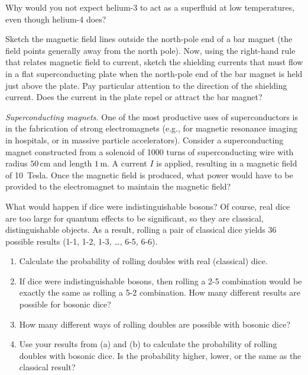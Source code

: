 \begin{problem}
Why would you not expect helium-3 to act as a superfluid at low
  temperatures, even though helium-4 does?
\label{prob:he3_superfluid}
\end{problem}


\begin{problem}
  Sketch the magnetic field lines outside the north-pole end of a bar
  magnet (the field points generally away from the north pole).  Now,
  using the right-hand rule that relates magnetic field to current,
  sketch the shielding currents that must flow in a flat
  superconducting plate when the north-pole end of the bar magnet is
  held just above the plate.  Pay particular attention to the
  direction of the shielding current.  Does the current in the plate
  repel or attract the bar magnet?
\label{prob:barmagnet}
\end{problem}


\begin{problem} 
  {\em Superconducting magnets.}  One of the most productive uses of
  superconductors is in the fabrication of strong electromagnets
  (e.g., for magnetic resonance imaging in hospitals, or in massive
  particle accelerators).  Consider a superconducting magnet
  constructed from a solenoid of 1000 turns of superconducting wire
  with radius $50\, \mbox{cm}$ and length $1\, \mbox{m}$.  A current
  $I$ is applied, resulting in a magnetic field of 10~Tesla.  Once the
  magnetic field is produced, what power would have to be provided to
  the electromagnet to maintain the magnetic field?
\label{prob:superconducting_magnets}
\end{problem}


\begin{problem}
  What would happen if dice were indistinguishable bosons?  Of course,
  real dice are too large for quantum effects to be significant, so
  they are classical, distinguishable objects.  As a result, rolling a
  pair of classical dice yields 36 possible results (1-1, 1-2, 1-3,
  \dots, 6-5, 6-6).
  \begin{enumerate}
  \item Calculate the probability of rolling doubles with real
    (classical) dice.
  \item If dice were indistinguishable bosons, then rolling a 2-5
    combination would be exactly the same as rolling a 5-2
    combination.  How many different results are possible for bosonic
    dice?
  \item How many different ways of rolling doubles are possible with
    bosonic dice?
  \item Use your results from (a) and (b) to calculate the probability
    of rolling doubles with bosonic dice.  Is the probability higher,
    lower, or the same as the classical result?
  \end{enumerate}
\end{problem}



